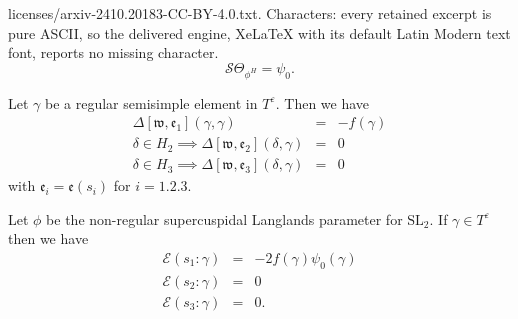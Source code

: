 \documentclass[10pt,a4paper]{amsart}
\def\SL{\mathrm{SL}}
\def\fe{\mathfrak{e}}
\def\fw{\mathfrak{w}}
\begin{document}
licenses/arxiv-2410.20183-CC-BY-4.0.txt. Characters: every retained excerpt is pure ASCII, so the delivered engine, XeLaTeX with its default Latin Modern text font, reports no missing character.
\begin{equation}\label{STheta}
\mathscr{S}\Theta_{\phi^H} = \psi_0.
\end{equation}

  \begin{lem}\label{Delta3} Let $\gamma$ be a regular semisimple element in $T^\varepsilon$.    Then we have
  \begin{eqnarray*}
   \Delta[\fw, \fe_1](\gamma, \gamma) & =&  - f(\gamma)\\
\delta \in H_2 \implies   \Delta[\fw, \fe_2](\delta, \gamma)  & =& 0\\
\delta \in H_3 \implies \Delta[\fw, \fe_3](\delta, \gamma)   &=& 0
  \end{eqnarray*}
  with $\fe_i = \fe(s_i)$ for $i = 1.2.3$.
  
 \end{lem}

\begin{thm}\label{abc}  Let $\phi$ be the non-regular supercuspidal Langlands parameter for $\SL_2$.   If $\gamma \in T^\varepsilon$ then  we have  
\begin{eqnarray*}
\mathscr{E}(s_1:\gamma) &=& -2f(\gamma) \psi_0(\gamma)\\
\mathscr{E}(s_2:\gamma) &=& 0\\
\mathscr{E}(s_3:\gamma) &=& 0.
 \end{eqnarray*}
 \end{thm}
\end{document}

